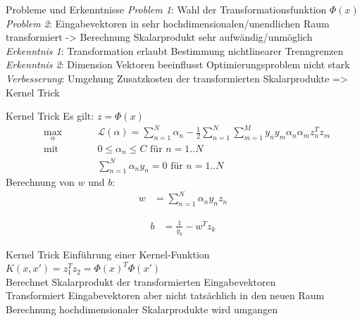 \documentclass[ngerman]{beamer}
\newcommand{\Lagr}{\mathcal{L}}
\begin{document}
\begin{frame}{Probleme und Erkenntnisse}
    \emph{Problem 1}: Wahl der Transformationsfunktion $\Phi(x)$ \\ \pause
    \emph{Problem 2}: Eingabevektoren in sehr hochdimensionalen/unendlichen Raum transformiert -> Berechnung Skalarprodukt sehr aufwändig/unmöglich \\ \pause
    \emph{Erkenntnis 1}: Transformation erlaubt Bestimmung nichtlinearer Trenngrenzen \\ \pause
    \emph{Erkenntnis 2}: Dimension Vektoren beeinflusst Optimierungsproblem nicht stark \\ \pause
    \emph{Verbesserung}: Umgehung Zusatzkosten der transformierten Skalarprodukte => Kernel Trick
\end{frame}

\begin{frame}{Kernel Trick} %
    Es gilt: $z = \Phi(x)$ \\
    \begin{subequations}
        \begin{alignat*}{2}
            &\!\max_{\alpha}        &\qquad&  	\Lagr(\alpha) = \sum_{n=1}^{N} \alpha_{n} - \frac{1}{2} \sum_{n=1}^{N} \sum_{m=1}^{M} y_{n} y_{m} \alpha_{n} \alpha_{m} z_{n}^{T} z_{m}\\
            &\text{mit } &      & 0 \leq \alpha_{n} \leq C \text{ für } n=1..N\\
            &       & & \sum_{n=1}^{N} \alpha_{n} y_{n} = 0\text{ für } n=1..N
        \end{alignat*}
    \end{subequations}
    \pause
    Berechnung von $w$ und $b$:
    \begin{equation*}
        \begin{aligned}
            w &= \sum_{n=1}^{N} \alpha_{n} y_{n} z_{n}
        \end{aligned}
    \end{equation*}

    \begin{equation*}
        \begin{aligned}
            b &= \frac{1}{y_{k}} - w^{T} z_{k}
        \end{aligned}
    \end{equation*}
\end{frame}

\begin{frame}{Kernel Trick}
    Einführung einer Kernel-Funktion $K(x, x') = z_{1}^{T} z_{2} = \Phi(x)^{T} \Phi(x')$ \\ \pause
    Berechnet Skalarprodukt der transformierten Eingabevektoren \\
    Transformiert Eingabevektoren aber nicht tatsächlich in den neuen Raum \\ \pause
    Berechnung hochdimensionaler Skalarprodukte wird umgangen
\end{frame}
\end{document}
